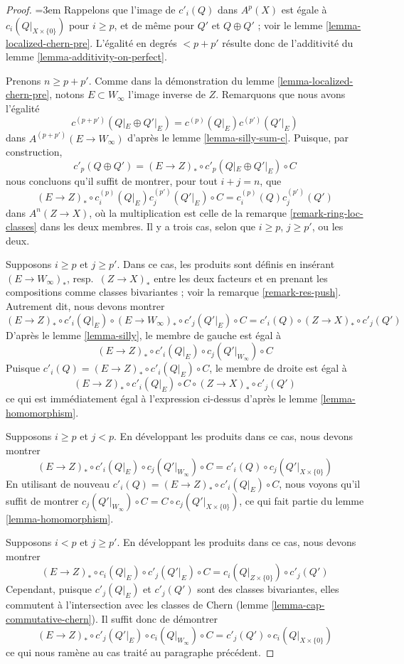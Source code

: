 \begin{proof}
{\emergencystretch=3em Rappelons que l'image de $c'_i(Q)$ dans $A^p(X)$ est égale à
$c_i(Q|_{X \times \{0\}})$ pour $i \geq p$, et de même pour
$Q'$ et $Q \oplus Q'$ ; voir le lemme \ref{lemma-localized-chern-pre}.
L'égalité en degrés $< p + p'$ résulte donc de
l'additivité du lemme \ref{lemma-additivity-on-perfect}.\par}

\medskip\noindent
Prenons $n \geq p + p'$.
Comme dans la démonstration du lemme \ref{lemma-localized-chern-pre},
notons $E \subset W_\infty$ l'image inverse de $Z$.
Remarquons que nous avons l'égalité
$$
c^{(p + p')}(Q|_E \oplus Q'|_E) =
c^{(p)}(Q|_E)c^{(p')}(Q'|_E)
$$
dans $A^{(p + p')}(E \to W_\infty)$ d'après le lemme \ref{lemma-silly-sum-c}.
Puisque, par construction,
$$
c'_p(Q \oplus Q') = (E \to Z)_* \circ c'_p(Q|_E \oplus Q'|_E) \circ C
$$
nous concluons qu'il suffit de montrer, pour tout $i + j = n$, que
$$
(E \to Z)_* \circ c^{(p)}_i(Q|_E)c^{(p')}_j(Q'|_E) \circ C
=
c^{(p)}_i(Q)c^{(p')}_j(Q')
$$
dans $A^n(Z \to X)$, où la multiplication est celle de la
remarque \ref{remark-ring-loc-classes} dans les deux membres. Il y a
trois cas, selon que $i \geq p$, $j \geq p'$, ou les deux.

\medskip\noindent
Supposons $i \geq p$ et $j \geq p'$. Dans ce cas, les produits sont
définis en insérant $(E \to W_\infty)_*$, resp.\ $(Z \to X)_*$ entre
les deux facteurs et en prenant les compositions comme classes bivariantes ; voir la
remarque \ref{remark-res-push}.
Autrement dit, nous devons montrer
$$
(E \to Z)_* \circ c'_i(Q|_E) \circ
(E \to W_\infty)_* \circ c'_j(Q'|_E) \circ C =
c'_i(Q) \circ (Z \to X)_* \circ c'_j(Q')
$$
D'après le lemme \ref{lemma-silly}, le membre de gauche est égal à
$$
(E \to Z)_* \circ c'_i(Q|_E) \circ c_j(Q'|_{W_\infty}) \circ C
$$
Puisque $c'_i(Q) = (E \to Z)_* \circ c'_i(Q|_E) \circ C$,
le membre de droite est égal à
$$
(E \to Z)_* \circ c'_i(Q|_E) \circ C \circ (Z \to X)_* \circ c'_j(Q')
$$
ce qui est immédiatement égal à l'expression ci-dessus
d'après le lemme \ref{lemma-homomorphism}.

\medskip\noindent
Supposons $i \geq p$ et $j < p$. En développant les produits
dans ce cas, nous devons montrer
$$
(E \to Z)_* \circ c'_i(Q|_E) \circ c_j(Q'|_{W_\infty}) \circ C =
c'_i(Q) \circ c_j(Q'|_{X \times \{0\}})
$$
En utilisant de nouveau $c'_i(Q) = (E \to Z)_* \circ c'_i(Q|_E) \circ C$,
nous voyons qu'il suffit de montrer $c_j(Q'|_{W_\infty}) \circ C =
C \circ c_j(Q'|_{X \times \{0\}})$, ce qui fait partie du
lemme \ref{lemma-homomorphism}.

\medskip\noindent
Supposons $i < p$ et $j \geq p'$. En développant les produits
dans ce cas, nous devons montrer
$$
(E \to Z)_* \circ c_i(Q|_E) \circ c'_j(Q'|_E) \circ C =
c_i(Q|_{Z \times \{0\}}) \circ c'_j(Q')
$$
Cependant, puisque $c'_j(Q|_E)$ et $c'_j(Q')$ sont des
classes bivariantes, elles commutent à l'intersection avec les classes de Chern
(lemme \ref{lemma-cap-commutative-chern}). Il suffit donc de démontrer
$$
(E \to Z)_* \circ c'_j(Q'|_E) \circ c_i(Q|_{W_\infty}) \circ C =
c'_j(Q') \circ c_i(Q|_{X \times \{0\}})
$$
ce qui nous ramène au cas traité au paragraphe précédent.
\end{proof}

